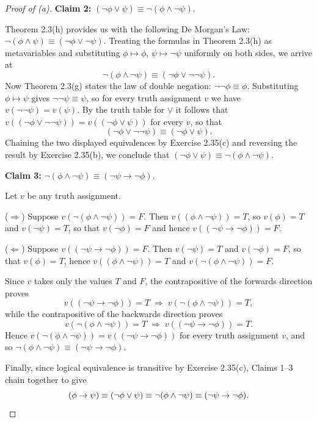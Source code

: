 \documentclass{article}
\theoremstyle{remark}\newtheorem{remark}{Remark}
\theoremstyle{plain}
\begin{document}
\begin{proof}[Proof of (a)]
    \medskip\noindent
    \textbf{Claim 2:} $(\neg\phi \lor \psi) \equiv \neg(\phi \land \neg\psi)$.

    \smallskip\noindent
    Theorem 2.3(h) provides us with the following De Morgan's Law:
    $\neg(\phi \land \psi) \equiv (\neg\phi \lor \neg\psi)$. Treating the
    formulas in Theorem 2.3(h) as metavariables and substituting
    $\phi \mapsto \phi$, $\psi \mapsto \neg\psi$ uniformly on both sides,
    we arrive at
    \[
        \neg(\phi \land \neg\psi) \equiv (\neg\phi \lor \neg\neg\psi).
    \]
    Now Theorem 2.3(g) states the law of double negation:
    $\neg\neg\phi \equiv \phi$. Substituting $\phi \mapsto \psi$ gives
    $\neg\neg\psi \equiv \psi$, so for every truth assignment $v$ we have
    $v(\neg\neg\psi) = v(\psi)$. By the truth table for $\lor$ it follows
    that $v((\neg\phi \lor \neg\neg\psi)) = v((\neg\phi \lor \psi))$ for
    every $v$, so that
    \[
        (\neg\phi \lor \neg\neg\psi) \equiv (\neg\phi \lor \psi).
    \]
    Chaining the two displayed equivalences by Exercise 2.35(c) and
    reversing the result by Exercise 2.35(b), we conclude that
    $(\neg\phi \lor \psi) \equiv \neg(\phi \land \neg\psi)$.

    \medskip\noindent
    \textbf{Claim 3:} $\neg(\phi \land \neg\psi) \equiv (\neg\psi \to \neg\phi)$.

    \smallskip\noindent
    Let $v$ be any truth assignment.

    \smallskip\noindent
    ($\Rightarrow$)\enspace
    Suppose $v(\neg(\phi \land \neg\psi)) = F$. Then
    $v((\phi \land \neg\psi)) = T$, so $v(\phi) = T$ and $v(\neg\psi) = T$,
    so that $v(\neg\phi) = F$ and hence $v((\neg\psi \to \neg\phi)) = F$.

    \smallskip\noindent
    ($\Leftarrow$)\enspace
    Suppose $v((\neg\psi \to \neg\phi)) = F$. Then $v(\neg\psi) = T$ and
    $v(\neg\phi) = F$, so that $v(\phi) = T$, hence
    $v((\phi \land \neg\psi)) = T$ and $v(\neg(\phi \land \neg\psi)) = F$.

    \smallskip
    Since $v$ takes only the values $T$ and $F$, the contrapositive of the
    forwards direction proves
    \[
        v((\neg\psi \to \neg\phi)) = T \;\Rightarrow\; v(\neg(\phi \land \neg\psi)) = T,
    \]
    while the contrapositive of the backwards direction proves
    \[
        v(\neg(\phi \land \neg\psi)) = T \;\Rightarrow\; v((\neg\psi \to \neg\phi)) = T.
    \]
    Hence $v(\neg(\phi \land \neg\psi)) = v((\neg\psi \to \neg\phi))$ for
    every truth assignment $v$, and so
    $\neg(\phi \land \neg\psi) \equiv (\neg\psi \to \neg\phi)$.

    \medskip\noindent
    Finally, since logical equivalence is transitive by Exercise 2.35(c),
    Claims 1--3 chain together to give
    \[
        (\phi \to \psi) \equiv (\neg\phi \lor \psi)
        \equiv \neg(\phi \land \neg\psi) \equiv (\neg\psi \to \neg\phi). \qedhere
    \]
\end{proof}
\end{document}
